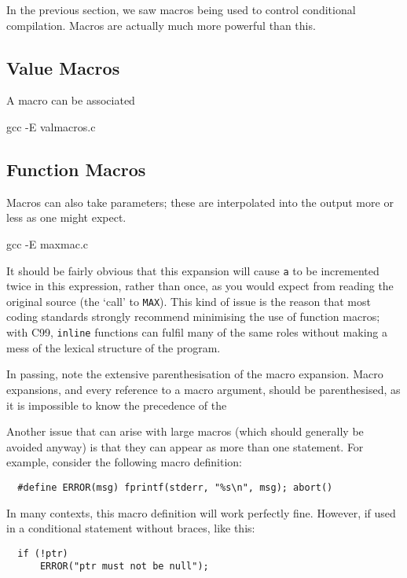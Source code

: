\documentclass[a4paper,10pt]{article}
\newcommand{\kw}[1]{\texttt{#1}}
\newcommand{\filename}[1]{\texttt{#1}}
\newcommand{\drmcode}[3]{\noindent\begin{minipage}{\columnwidth}\end{minipage}}
\newcommand{\cfile}[1]{\drmcode{C}{\filename{#1}}{#1}}
\begin{document}
In the previous section, we saw macros being used to control
conditional compilation. Macros are actually much more powerful than
this.

\subsection{Value Macros}

A macro can be associated 

\cfile{valmacros.c}

gcc -E valmacros.c
\END



\subsection{Function Macros}

Macros can also take parameters; these are interpolated into the
output more or less as one might expect.


\cfile{maxmac.c}

gcc -E maxmac.c
\END

\noindent
It should be fairly obvious that this expansion will cause \kw{a} to
be incremented twice in this expression, rather than once, as you
would expect from reading the original source (the `call' to
\kw{MAX}). This kind of issue is the reason that most coding standards
strongly recommend minimising the use of function macros; with C99,
\kw{inline} functions can fulfil many of the same roles without making
a mess of the lexical structure of the program.

In passing, note the extensive parenthesisation of the macro
expansion. Macro expansions, and every reference to a macro argument,
should be parenthesised, as it is impossible to know the precedence of
the 

Another issue that can arise with large macros (which should generally
be avoided anyway) is that they can appear as more than one
statement. For example, consider the following macro definition:

\begin{lstlisting}
  #define ERROR(msg) fprintf(stderr, "%s\n", msg); abort()
\end{lstlisting}

\noindent
In many contexts, this macro definition will work perfectly
fine. However, if used in a conditional statement without braces, like
this:

\begin{lstlisting}
  if (!ptr)
      ERROR("ptr must not be null");
\end{lstlisting}
\end{document}
